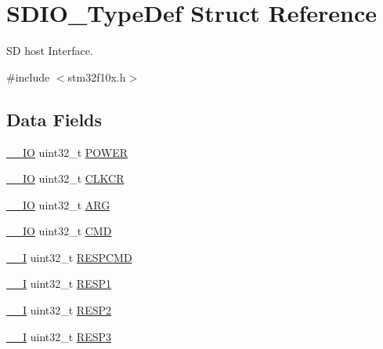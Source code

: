 \hypertarget{struct_s_d_i_o___type_def}{}\section{S\+D\+I\+O\+\_\+\+Type\+Def Struct Reference}
\label{struct_s_d_i_o___type_def}


SD host Interface.  




{\ttfamily \#include $<$stm32f10x.\+h$>$}

\subsection*{Data Fields}
\begin{DoxyCompactItemize}
\item 
\mbox{\hyperlink{core__sc300_8h_aec43007d9998a0a0e01faede4133d6be}{\+\_\+\+\_\+\+IO}} uint32\+\_\+t \mbox{\hyperlink{struct_s_d_i_o___type_def_a65bff76f3af24c37708a1006d54720c7}{P\+O\+W\+ER}}
\item 
\mbox{\hyperlink{core__sc300_8h_aec43007d9998a0a0e01faede4133d6be}{\+\_\+\+\_\+\+IO}} uint32\+\_\+t \mbox{\hyperlink{struct_s_d_i_o___type_def_aa94197378e20fc739d269be49d9c5d40}{C\+L\+K\+CR}}
\item 
\mbox{\hyperlink{core__sc300_8h_aec43007d9998a0a0e01faede4133d6be}{\+\_\+\+\_\+\+IO}} uint32\+\_\+t \mbox{\hyperlink{struct_s_d_i_o___type_def_a07d4e63efcbde252c667e64a8d818aa9}{A\+RG}}
\item 
\mbox{\hyperlink{core__sc300_8h_aec43007d9998a0a0e01faede4133d6be}{\+\_\+\+\_\+\+IO}} uint32\+\_\+t \mbox{\hyperlink{struct_s_d_i_o___type_def_adcf812cbe5147d300507d59d4a55935d}{C\+MD}}
\item 
\mbox{\hyperlink{core__sc300_8h_af63697ed9952cc71e1225efe205f6cd3}{\+\_\+\+\_\+I}} uint32\+\_\+t \mbox{\hyperlink{struct_s_d_i_o___type_def_aad371db807e2db4a2edf05b3f2f4b6cd}{R\+E\+S\+P\+C\+MD}}
\item 
\mbox{\hyperlink{core__sc300_8h_af63697ed9952cc71e1225efe205f6cd3}{\+\_\+\+\_\+I}} uint32\+\_\+t \mbox{\hyperlink{struct_s_d_i_o___type_def_a7b0ee0dc541683266dfab6335abca891}{R\+E\+S\+P1}}
\item 
\mbox{\hyperlink{core__sc300_8h_af63697ed9952cc71e1225efe205f6cd3}{\+\_\+\+\_\+I}} uint32\+\_\+t \mbox{\hyperlink{struct_s_d_i_o___type_def_a4d99c78dffdb6e81e8f6b7abec263419}{R\+E\+S\+P2}}
\item 
\mbox{\hyperlink{core__sc300_8h_af63697ed9952cc71e1225efe205f6cd3}{\+\_\+\+\_\+I}} uint32\+\_\+t \mbox{\hyperlink{struct_s_d_i_o___type_def_a3da04fbdd44f48a1840e5e0a6295f3cf}{R\+E\+S\+P3}}

\end{DoxyCompactItemize}
